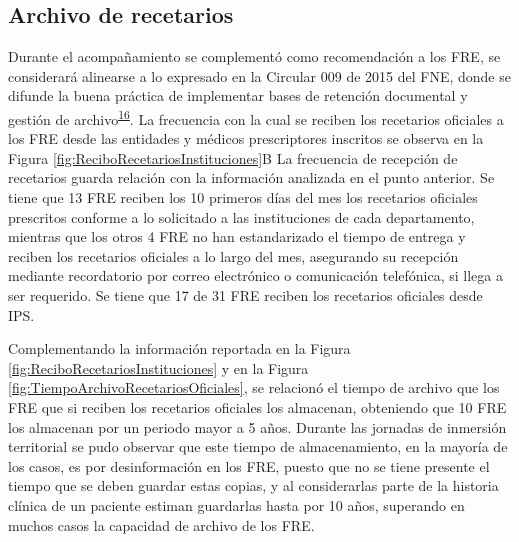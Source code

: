 \documentclass[
]{book}
\begin{document}
\hypertarget{archivo-de-recetarios}{%
\subsection{Archivo de recetarios}\label{archivo-de-recetarios}}

Durante el acompañamiento se complementó como recomendación a los FRE, se considerará alinearse a lo expresado en la Circular 009 de 2015 del FNE, donde se difunde la buena práctica de implementar bases de retención documental y gestión de archivo\textsuperscript{\protect\hyperlink{ref-FNE2015-9}{16}}. La frecuencia con la cual se reciben los recetarios oficiales a los FRE desde las entidades y médicos prescriptores inscritos se observa en la Figura \ref{fig:ReciboRecetariosInstituciones}B La frecuencia de recepción de recetarios guarda relación con la información analizada en el punto anterior. Se tiene que 13 FRE reciben los 10 primeros días del mes los recetarios oficiales prescritos conforme a lo solicitado a las instituciones de cada departamento, mientras que los otros 4 FRE no han estandarizado el tiempo de entrega y reciben los recetarios oficiales a lo largo del mes, asegurando su recepción mediante recordatorio por correo electrónico o comunicación telefónica, si llega a ser requerido. Se tiene que 17 de 31 FRE reciben los recetarios oficiales desde IPS.

Complementando la información reportada en la Figura \ref{fig:ReciboRecetariosInstituciones} y en la Figura \ref{fig:TiempoArchivoRecetariosOficiales}, se relacionó el tiempo de archivo que los FRE que si reciben los recetarios oficiales los almacenan, obteniendo que 10 FRE los almacenan por un periodo mayor a 5 años. Durante las jornadas de inmersión territorial se pudo observar que este tiempo de almacenamiento, en la mayoría de los casos, es por desinformación en los FRE, puesto que no se tiene presente el tiempo que se deben guardar estas copias, y al considerarlas parte de la historia clínica de un paciente estiman guardarlas hasta por 10 años, superando en muchos casos la capacidad de archivo de los FRE.
\end{document}

